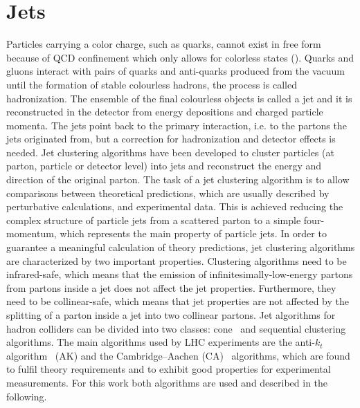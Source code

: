 \section{Jets}\label{sec:jets}

Particles carrying a color charge, such as quarks, cannot exist in free form because of QCD confinement which only allows for colorless states (). Quarks and gluons interact with pairs of quarks and anti-quarks produced from the vacuum until the formation of stable colourless hadrons, the process is called hadronization. The ensemble of the final colourless objects is called a jet and it is reconstructed in the detector from energy depositions and charged particle momenta.
The jets point back to the primary interaction, i.e. to the partons the jets originated from, but a correction for hadronization and detector effects is needed. Jet clustering algorithms have been developed to cluster particles (at parton, particle or detector level) into jets and reconstruct the energy and direction of the original parton. The task of a jet clustering algorithm is to allow comparisons between theoretical predictions, which are usually described by perturbative calculations, and experimental data. This is achieved reducing the complex structure of particle jets from a scattered parton to a simple four-momentum, which represents the main property of particle jets.
In order to guarantee a meaningful calculation of theory predictions, jet clustering algorithms are characterized by two important properties.
Clustering algorithms need to be infrared-safe, which means that the emission of infinitesimally-low-energy partons from partons inside a jet does not affect the jet properties. Furthermore, they need to be collinear-safe, which means that jet properties are not affected by the splitting of a parton inside a jet into two collinear partons.
Jet algorithms for hadron colliders can be divided into two classes: cone~\cite{Salam:2007xv} and sequential clustering~\cite{Catani:1993hr,Ellis:1993tq,Dokshitzer:1997in,Wobisch:1998wt,Cacciari:2008gp} algorithms.
The main algorithms used by LHC experiments are the anti-$k_t$ algorithm~\cite{Cacciari:2008gp} (AK) and the Cambridge--Aachen (CA)~\cite{Catani:1993hr,Dokshitzer:1997in} algorithms, which are found to fulfil theory requirements and to exhibit good properties for experimental measurements. For this work both algorithms are used and described in the following.
 
